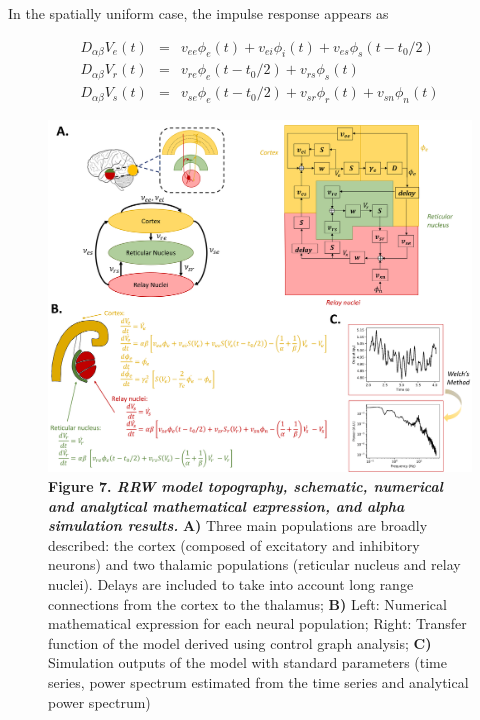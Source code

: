 \documentclass[12pt,twoside]{article}
\begin{document}
In the spatially uniform case, the impulse response appears as 

\begin{eqnarray}
    D_{\alpha \beta} V_e (t) &=& v_{ee} \phi_e (t)+v_{ei} \phi_i (t)+v_{es} \phi_s (t-t_0/2) \\
    D_{\alpha \beta} V_r (t) &=& v_{re} \phi_e (t-t_0 /2)+v_{rs} \phi_s (t) \\
    D_{\alpha \beta} V_s (t) &=& v_{se} \phi_e (t-t_0 /2)+v_{sr} \phi_r (t)+v_{sn} \phi_n (t)
\end{eqnarray}

\begin{figure}[H]
    \centering
    \includegraphics[scale=0.35]{Images/Robinson_schematic_short.png}
    \caption*{\textbf{Figure 7.  \textit{RRW model topography, schematic, numerical and analytical mathematical expression, and alpha simulation results.}} \textbf{A)} Three main populations are broadly described: the cortex (composed of excitatory and inhibitory neurons) and two thalamic populations (reticular nucleus and relay nuclei). Delays are included to take into account long range connections from the cortex to the thalamus; \textbf{B)} Left: Numerical mathematical expression for each neural population; Right: Transfer function of the model derived using control graph analysis; \textbf{C)} Simulation outputs of the model with standard parameters (time series, power spectrum estimated from the time series and analytical power spectrum)}            
    \label{fig:Rob_topography}
\end{figure}
\end{document}
